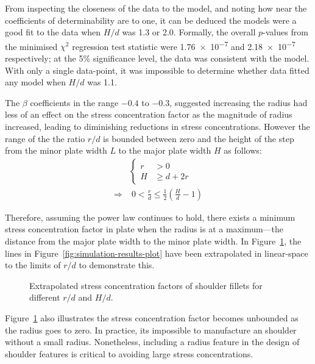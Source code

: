 \documentclass[a4paper,11pt,twocolumn]{article}
\begin{document}
From inspecting the closeness of the data to the model, and noting how near the
coefficients of determinability are to one, it can be deduced the models were a
good fit to the data when $H/d$ was 1.3 or 2.0. Formally, the overall $p$-values
from the minimised $\chi^2$ regression test statistic were \num{1.76e-7} and
\num{2.18e-7} respectively; at the 5\% significance level, the data was
consistent with the model. With only a single data-point, it was impossible to
determine whether data fitted any model when $H/d$ was 1.1.

The $\beta$ coefficients in the range $-0.4$ to $-0.3$, suggested increasing the
radius had less of an effect on the stress concentration factor as the magnitude
of radius increased, leading to diminishing reductions in stress concentrations.
However the range of the the ratio $r/d$ is bounded between zero and the height
of the step from the minor plate width $L$ to the major plate width $H$ as
follows:
\begin{align}
    \nonumber
    &\left\{
    \begin{aligned}
        r &> 0 \\
        H &\geq d + 2 r
    \end{aligned}
    \right. \\
    \Rightarrow
    &\;0 < \frac{r}{d} \leq \frac{1}{2}\left(\frac{H}{d} - 1\right)
\end{align}

Therefore, assuming the power law continues to hold, there exists a minimum
stress concentration factor in plate when the radius is at a maximum---the
distance from the major plate width to the minor plate width. In 
Figure~\ref{fig:simulation-extrapolated}, the lines in
Figure~\vref{fig:simulation-results-plot} have been extrapolated in linear-space
to the limits of $r/d$ to demonstrate this.

\begin{figure}[h]
    \small
    \centering
    \def\svgwidth{\linewidth}
    
    \caption{Extrapolated stress concentration factors of shoulder fillets for
        different $r/d$ and $H/d$.}
    \label{fig:simulation-extrapolated}
\end{figure}

Figure~\ref{fig:simulation-extrapolated} also illustrates the stress 
concentration factor becomes unbounded as the radius goes to zero. In practice,
its impossible to manufacture an shoulder without a small radius. Nonetheless,
including a radius feature in the design of shoulder features is critical to
avoiding large stress concentrations.
\end{document}
